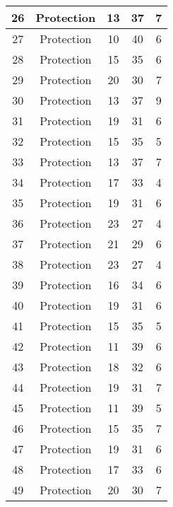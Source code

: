 \documentclass[results.tex]{subfiles}
\begin{document}
\begin{center}
\begin{tabular}{| c || c | c | c | c |}
    \hline
    26 & Protection & 13 & 37 & 7 \\ 
    \hline
    27 & Protection & 10 & 40 & 6 \\ 
    \hline
    28 & Protection & 15 & 35 & 6 \\ 
    \hline
    29 & Protection & 20 & 30 & 7 \\ 
    \hline
    30 & Protection & 13 & 37 & 9 \\ 
    \hline
    31 & Protection & 19 & 31 & 6 \\ 
    \hline
    32 & Protection & 15 & 35 & 5 \\ 
    \hline
    33 & Protection & 13 & 37 & 7 \\ 
    \hline
    34 & Protection & 17 & 33 & 4 \\ 
    \hline
    35 & Protection & 19 & 31 & 6 \\ 
    \hline
    36 & Protection & 23 & 27 & 4 \\ 
    \hline
    37 & Protection & 21 & 29 & 6 \\ 
    \hline
    38 & Protection & 23 & 27 & 4 \\ 
    \hline
    39 & Protection & 16 & 34 & 6 \\ 
    \hline
    40 & Protection & 19 & 31 & 6 \\ 
    \hline
    41 & Protection & 15 & 35 & 5 \\ 
    \hline
    42 & Protection & 11 & 39 & 6 \\ 
    \hline
    43 & Protection & 18 & 32 & 6 \\ 
    \hline
    44 & Protection & 19 & 31 & 7 \\ 
    \hline
    45 & Protection & 11 & 39 & 5 \\ 
    \hline
    46 & Protection & 15 & 35 & 7 \\ 
    \hline
    47 & Protection & 19 & 31 & 6 \\ 
    \hline
    48 & Protection & 17 & 33 & 6 \\ 
    \hline
    49 & Protection & 20 & 30 & 7 \\ 
    \hline   \end{tabular}
\end{center}
\end{document}
